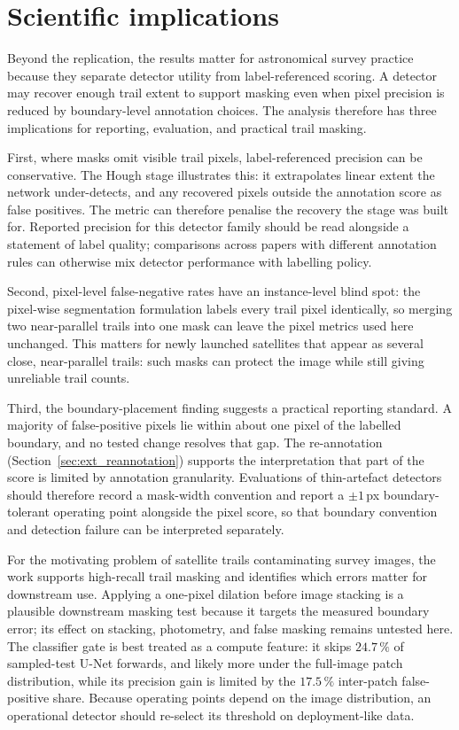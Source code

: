 \documentclass{cam-thesis}
\begin{document}
\section{Scientific implications}
\label{sec:implications}

Beyond the replication, the results matter for astronomical survey practice
because they separate detector utility from label-referenced scoring. A
detector may recover enough trail extent to support masking even when pixel
precision is reduced by boundary-level annotation choices. The analysis
therefore has three implications for reporting, evaluation, and practical trail
masking.

First, where masks omit visible trail pixels, label-referenced precision
can be conservative. The Hough stage illustrates this: it extrapolates linear
extent the network under-detects, and any recovered pixels outside the
annotation score as false positives. The metric can therefore penalise the
recovery the stage was built for. Reported precision for this detector family
should be read alongside a statement of label quality; comparisons across
papers with different annotation rules can otherwise mix detector performance
with labelling policy.

Second, pixel-level false-negative rates have an instance-level blind spot: the
pixel-wise segmentation formulation labels every trail pixel identically, so
merging two near-parallel trails into one mask can leave the pixel metrics used
here unchanged. This matters for newly launched satellites that appear as
several close, near-parallel trails: such masks can protect the image while
still giving unreliable trail counts.

Third, the boundary-placement finding suggests a practical reporting standard.
A majority of false-positive pixels lie within about one pixel of the labelled
boundary, and no tested change resolves that gap. The re-annotation
(Section~\ref{sec:ext_reannotation}) supports the interpretation that
part of the score is limited by annotation granularity. Evaluations of
thin-artefact detectors should therefore record a mask-width convention and
report a $\pm1$\,px boundary-tolerant operating point alongside the pixel
score, so that boundary convention and detection failure can be interpreted
separately.

For the motivating problem of satellite trails contaminating survey images, the
work supports high-recall trail masking and identifies which
errors matter for downstream use. Applying a one-pixel dilation before image
stacking is a plausible downstream masking test because it targets the measured
boundary error; its effect on stacking, photometry, and false masking remains
untested here. The classifier gate is best treated as a compute feature: it
skips $24.7\,\%$ of sampled-test U-Net forwards, and likely more under the
full-image patch distribution, while its precision gain is limited by the
$17.5\,\%$ inter-patch false-positive share. Because operating points depend on
the image distribution, an operational detector should re-select its threshold
on deployment-like data.
\end{document}
